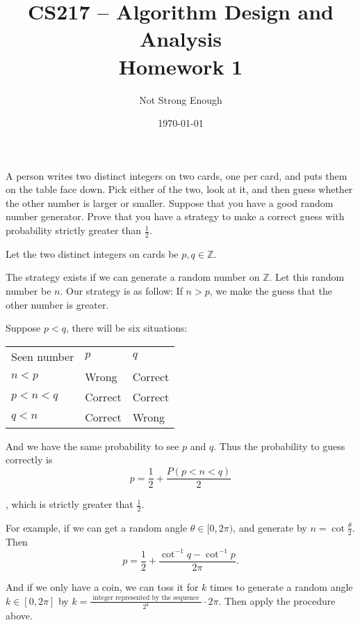 \documentclass[UTF8, a4paper, linespread=1.5]{article}
\title{CS217 -- Algorithm Design and Analysis \\ Homework 1}
\date{\today}
\author{Not Strong Enough}
\begin{document}
\maketitle

\begin{thm}{}{}
A person writes two distinct integers on two cards, one per card,
and puts them on the table face down. Pick either of the two, look at it, and then guess
whether the other number is larger or smaller. Suppose that you have a good random number
generator. Prove that you have a strategy to make a correct guess with probability strictly
greater than $\frac{1}{2}$.
\end{thm}

Let the two distinct integers on cards be $p, q \in \mathbb{Z} $.

The strategy exists if we can generate a random number on $\mathbb{Z} $. Let this random number be $n$.
Our strategy is as follow: If $n > p$, we make the guess that the other number is greater.

Suppose $p < q$, there will be six situations:

\begin{table}[h!]
    \centering
    \begin{tabular}{lll}
        Seen number   & $p$     & $q$     \\
        $n < p$         & Wrong   & Correct \\
        $p < n < q$ & Correct & Correct \\
        $q < n$     & Correct & Wrong
    \end{tabular}
\end{table}

And we have the same probability to see $p$ and $q$. Thus the probability to guess correctly is
$$p = \frac{1}{2} + \frac{P(p < n < q)}{2}$$

, which is strictly greater that $\frac{1}{2}$.

For example, if we can get a random angle $\theta \in [0,2\pi)$, and generate by $n = \cot \frac{\theta}{2}$. Then $$p = \frac{1}{2} + \frac{\cot^{-1} q - \cot^{-1} p}{2\pi}.$$

And if we only have a coin, we can toss it for $k$ times to generate a random angle $k \in [0, 2\pi]$ by
$k = \frac{\text{ integer represented by the sequence }}{2^k} \cdot 2\pi$. Then apply the procedure above.
\end{document}
